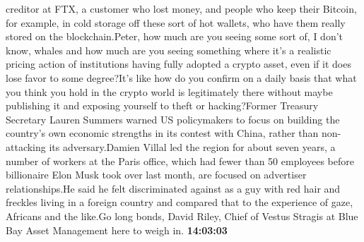 \documentclass{article}%
\begin{document}
creditor at FTX, a customer who lost money, and people who keep their Bitcoin, for example, in cold storage off these sort of hot wallets, who have them really stored on the blockchain.Peter, how much are you seeing some sort of, I don't know, whales and how much are you seeing something where it's a realistic pricing action of institutions having fully adopted a crypto asset, even if it does lose favor to some degree?It's like how do you confirm on a daily basis that what you think you hold in the crypto world is legitimately there without maybe publishing it and exposing yourself to theft or hacking?Former Treasury Secretary Lauren Summers warned US policymakers to focus on building the country's own economic strengths in its contest with China, rather than non{-}attacking its adversary.Damien Villal led the region for about seven years, a number of workers at the Paris office, which had fewer than 50 employees before billionaire Elon Musk took over last month, are focused on advertiser relationships.He said he felt discriminated against as a guy with red hair and freckles living in a foreign country and compared that to the experience of gaze, Africans and the like.Go long bonds, David Riley, Chief of Vestus Stragis at Blue Bay Asset Management here to weigh in.%
\textbf{14:03:03}%
\newline%
\end{document}
